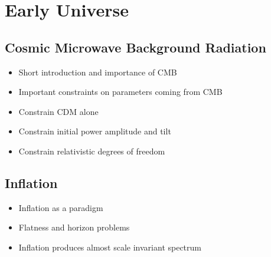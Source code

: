 \section{Early Universe}

\subsection{Cosmic Microwave Background Radiation}
\begin{itemize}
\item Short introduction and importance of CMB
\item Important constraints on parameters coming from CMB
\item Constrain CDM alone
\item Constrain initial power amplitude and tilt
\item Constrain relativistic degrees of freedom
\end{itemize}

\subsection{Inflation}
\begin{itemize}
\item Inflation as a paradigm
\item Flatness and horizon problems
\item Inflation produces almost scale invariant spectrum
\end{itemize}






